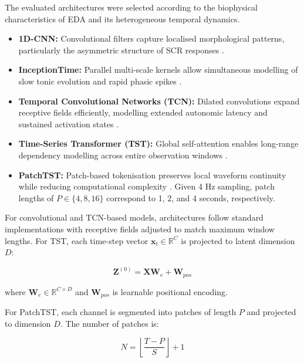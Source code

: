 \documentclass[runningheads]{llncs}
\begin{document}
The evaluated architectures were selected according to the biophysical characteristics of EDA and its heterogeneous temporal dynamics.

\begin{itemize}
    \item \textbf{1D-CNN:} Convolutional filters capture localised morphological patterns, particularly the asymmetric structure of SCR responses \cite{Nandipati2024}.
    \item \textbf{InceptionTime:} Parallel multi-scale kernels allow simultaneous modelling of slow tonic evolution and rapid phasic spikes \cite{InceptionTime2020}.
    \item \textbf{Temporal Convolutional Networks (TCN):} Dilated convolutions expand receptive fields efficiently, modelling extended autonomic latency and sustained activation states \cite{Luo2024}.
    \item \textbf{Time-Series Transformer (TST):} Global self-attention enables long-range dependency modelling across entire observation windows \cite{Tsirmpas2025}.
    \item \textbf{PatchTST:} Patch-based tokenisation preserves local waveform continuity while reducing computational complexity \cite{Wang2024,Kim2024}. Given 4 Hz sampling, patch lengths of $P \in \{4,8,16\}$ correspond to 1, 2, and 4 seconds, respectively.
\end{itemize}


For convolutional and TCN-based models, architectures follow standard implementations with receptive fields adjusted to match maximum window lengths. For TST, each time-step vector $\mathbf{x}_t \in \mathbb{R}^{C}$ is projected to latent dimension $D$:

\begin{equation}
\mathbf{Z}^{(0)} = \mathbf{X} \mathbf{W}_e + \mathbf{W}_{pos}
\end{equation}

\noindent where $\mathbf{W}_e \in \mathbb{R}^{C \times D}$ and $\mathbf{W}_{pos}$ is learnable positional encoding.

For PatchTST, each channel is segmented into patches of length $P$ and projected to dimension $D$. The number of patches is:

\begin{equation}
N = \left\lfloor \frac{T - P}{S} \right\rfloor + 1
\end{equation}
\end{document}
